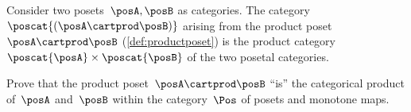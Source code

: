 
\begin{example}
    Consider two posets~$\posA,\posB$ as categories.
    The category~$\poscat{(\posA\cartprod \posB)}$ arising from the product poset~$\posA\cartprod \posB$ (\cref{def:productposet}) is the product category~$\poscat{\posA} \times \poscat{\posB}$ of the two posetal categories.
\end{example}

\begin{gradedexercise}
    Prove that the product poset~$\posA \cartprod \posB$ ``is'' the categorical product of~$\posA$ and~$\posB$ within the category~$\Pos$ of posets and monotone maps.
\end{gradedexercise}

